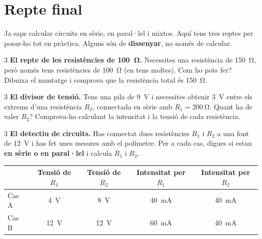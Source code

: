 \section{Repte final}

Ja saps calcular circuits en sèrie, en paral·lel i mixtos. Aquí tens tres reptes per posar-ho tot en pràctica. Alguns són de \textbf{dissenyar}, no només de calcular.

\begin{exercici}{3}
\textbf{El repte de les resistències de \SI{100}{\ohm}.} Necessites una resistència de \SI{150}{\ohm}, però només tens resistències de \SI{100}{\ohm} (en tens moltes). Com ho pots fer? Dibuixa el muntatge i comprova que la resistència total és \SI{150}{\ohm}.
\end{exercici}

\begin{exercici}{3}
\textbf{El divisor de tensió.} Tens una pila de \SI{9}{V} i necessites obtenir \SI{3}{V} entre els extrems d'una resistència $R_2$, connectada en sèrie amb $R_1 = \SI{200}{\ohm}$. Quant ha de valer $R_2$? Comprova-ho calculant la intensitat i la tensió de cada resistència.
\end{exercici}

\begin{exercici}{3}
\textbf{El detectiu de circuits.} Has connectat dues resistències $R_1$ i $R_2$ a una font de \SI{12}{V} i has fet unes mesures amb el polímetre. Per a cada cas, digues si estan \textbf{en sèrie o en paral·lel} i calcula $R_1$ i $R_2$.
\begin{center}
\renewcommand{\arraystretch}{1.5}
\begin{tabular}{@{}lcccc@{}}
\toprule
 & \textbf{Tensió de $R_1$} & \textbf{Tensió de $R_2$} & \textbf{Intensitat per $R_1$} & \textbf{Intensitat per $R_2$}\\
\midrule
Cas A & \SI{4}{V} & \SI{8}{V} & \SI{40}{mA} & \SI{40}{mA}\\
Cas B & \SI{12}{V} & \SI{12}{V} & \SI{60}{mA} & \SI{40}{mA}\\
\bottomrule
\end{tabular}
\end{center}
\end{exercici}

